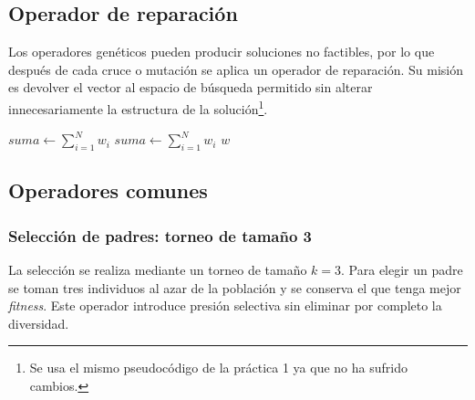 \subsection{Operador de reparación}
Los operadores genéticos pueden producir soluciones no factibles, por lo que después de cada cruce o mutación se aplica un operador de reparación. Su misión es devolver el vector al espacio de búsqueda permitido sin alterar innecesariamente la estructura de la solución\footnote{Se usa el mismo pseudocódigo de la práctica 1 ya que no ha sufrido cambios.}.

\newpage
\begin{algorithm}[H]
\SetAlgoLined
{}
 $suma \leftarrow \sum_{i=1}^{N} w_i$\;
 $suma \leftarrow \sum_{i=1}^{N} w_i$\;
 \Return $w$\;
 \caption{Operador de Reparación \texttt{fix(w)}}
 \label{alg:fix}
\end{algorithm}


\subsection{Operadores comunes}
\subsubsection{Selección de padres: torneo de tamaño 3}
La selección se realiza mediante un torneo de tamaño $k=3$. Para elegir un padre se toman tres individuos al azar de la población y se conserva el que tenga mejor \textit{fitness}. Este operador introduce presión selectiva sin eliminar por completo la diversidad.

